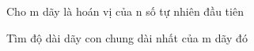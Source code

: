 Cho m dãy là hoán vị của n số tự nhiên đầu tiên  

   Tìm độ dài dãy con chung dài nhất của m dãy đó